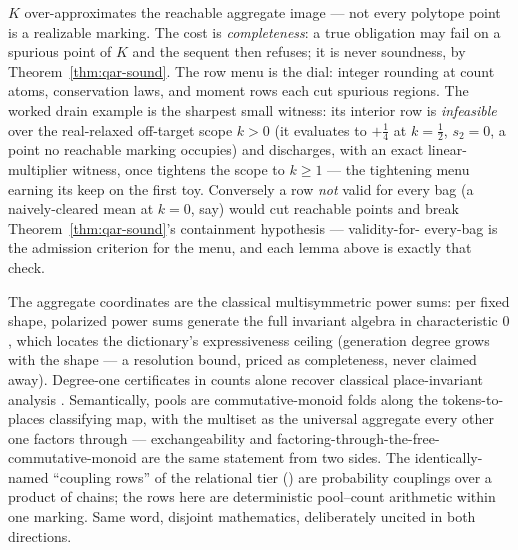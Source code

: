 \begin{bremark}
\label{rem:qar-gap}
$K$ over-approximates the reachable aggregate image --- not every
polytope point is a realizable marking. The cost is
\emph{completeness}: a true obligation may fail on a spurious point of
$K$ and the sequent then refuses; it is never soundness, by
Theorem~\ref{thm:qar-sound}. The row menu is the dial: integer
rounding at count atoms, conservation laws, and moment rows each cut
spurious regions. The worked drain example is the sharpest small
witness: its interior row is \emph{infeasible} over the real-relaxed
off-target scope $k > 0$ (it evaluates to $+\tfrac14$ at
$k = \tfrac12$, $s_2 = 0$, a point no reachable marking occupies) and
discharges, with an exact linear-multiplier witness, once
 tightens the scope to $k \geq 1$ ---
the tightening menu earning its keep on the first toy. Conversely a
row \emph{not} valid for every bag (a naively-cleared mean at
$k = 0$, say) would cut reachable points and break
Theorem~\ref{thm:qar-sound}'s containment hypothesis --- validity-for-
every-bag is the admission criterion for the menu, and each lemma
above is exactly that check.
\end{bremark}

\begin{bremark}
The aggregate coordinates are the classical multisymmetric power sums:
per fixed shape, polarized power sums generate the full invariant
algebra in characteristic $0$ \cite{weyl1939}, which locates the
dictionary's expressiveness ceiling (generation degree grows with the
shape --- a resolution bound, priced as completeness, never claimed
away). Degree-one certificates in counts alone recover classical
place-invariant analysis \cite{murata1989}. Semantically, pools are
commutative-monoid folds along the tokens-to-places classifying map,
with the multiset as the universal aggregate every other one factors
through \cite{spivak2021agg} --- exchangeability and
factoring-through-the-free-commutative-monoid are the same statement
from two sides. The identically-named ``coupling rows'' of the
relational tier () are probability couplings
over a product of chains; the rows here are deterministic pool--count
arithmetic within one marking. Same word, disjoint mathematics,
deliberately uncited in both directions.
\end{bremark}

